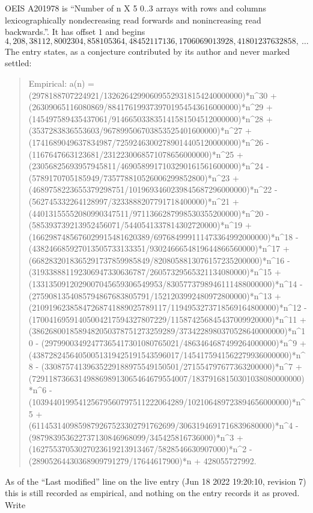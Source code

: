 \documentclass[11pt,a4paper]{article}
\theoremstyle{plain}
\theoremstyle{definition}
\begin{document}
OEIS A201978 is ``Number of n X 5 0..3 arrays with rows and columns lexicographically nondecreasing read forwards and nonincreasing read backwards.''. It has offset $1$ and begins
\[
4, 208, 38112, 8002304, 858105364, 48452117136, 1706069013928, 41801237632858,\ \dots
\]
The entry states, as a conjecture contributed by its author and never marked settled:
\begin{quote}\raggedright\small
Empirical: a(n) = (2978188707224921/132626429906095529318154240000000)*n\^{}30 + (26309065116080869/8841761993739701954543616000000)*n\^{}29 + (145497589435437061/914665033835141581504512000000)*n\^{}28 + (3537283836553603/967899506703853525401600000)*n\^{}27 + (1741689049637834987/72592463002789014405120000000)*n\^{}26 - (1167647663123681/2312230068571078656000000)*n\^{}25 + (23056825693957945811/4690589917103290161561600000)*n\^{}24 - (5789170705185949/735778810526006299852800)*n\^{}23 + (4689758223655379298751/1019693460239845687296000000)*n\^{}22 - (562745332264128997/3233888207791718400000)*n\^{}21 + (44013155552080990347511/9711366287998530355200000)*n\^{}20 - (585393739213952456071/5440541337814302720000)*n\^{}19 + (1662987485676029915481620389/697684999111473364992000000)*n\^{}18 - (438246685927013505733133351/9302466654819644866560000)*n\^{}17 + (6682832018365291737859985849/8208058813076157235200000)*n\^{}16 - (319338881192306947330636787/26057329565321134080000)*n\^{}15 + (1331350912029007045659306549953/8305773798946111488000000)*n\^{}14 - (2759081354085794867683805791/1521203992480972800000)*n\^{}13 + (21091962385847268741889025789117/1194953273718569164800000)*n\^{}12 - (17004169591405004217594327807229/115874256845437009920000)*n\^{}11 + (3862680018589482050378751273259289/3734228980370528640000000)*n\^{}10 - (29799003492477365417301080765021/4863464687499264000000)*n\^{}9 + (43872824564050051319425191543596017/1454175941562279936000000)*n\^{}8 - (33087574139635229188975549150501/271554797677363200000)*n\^{}7 + (7291187366314988698913065464679554007/18379168150301038080000000)*n\^{}6 - (103944019954125679560797511222064289/102106489723894656000000)*n\^{}5 + (6114531409859879267523302791762699/3063194691716839680000)*n\^{}4 - (987983953622737130846968099/345425816736000)*n\^{}3 + (16275537053027023619213913467/5828546630907000)*n\^{}2 - (28905264430368909791279/17644617900)*n + 428055727992.
\end{quote}
As of the ``Last modified'' line on the live entry (Jun 18 2022 19:20:10, revision 7) this is still
recorded as empirical, and nothing on the entry records it as proved. Write
\end{document}
